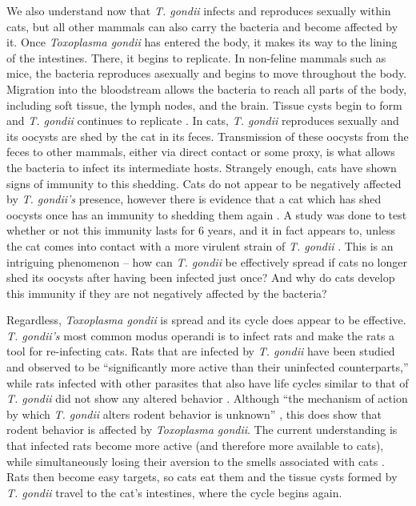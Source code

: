 \documentclass[twocolumn]{article}
\begin{document}
We also understand now that \textit{T. gondii} infects and reproduces sexually within cats, but all other mammals can also carry the bacteria and become affected by it. Once \textit{Toxoplasma gondii} has entered the body, it makes its way to the lining of the intestines. There, it begins to replicate. In non-feline mammals such as mice, the bacteria reproduces asexually and begins to move throughout the body. Migration into the bloodstream allows the bacteria to reach all parts of the body, including soft tissue, the lymph nodes, and the brain. Tissue cysts begin to form and \textit{T. gondii} continues to replicate \cite{Tmice}. In cats, \textit{T. gondii} reproduces sexually and its oocysts are shed by the cat in its feces. Transmission of these oocysts from the feces to other mammals, either via direct contact or some proxy, is what allows the bacteria to infect its intermediate hosts. Strangely enough, cats have shown signs of immunity to this shedding. Cats do not appear to be negatively affected by \textit{T. gondii's} presence, however there is evidence that a cat which has shed oocysts once has an immunity to shedding them again \cite{Tcat_immunity}. A study was done to test whether or not this immunity lasts for 6 years, and it in fact appears to, unless the cat comes into contact with a more virulent strain of \textit{T. gondii} \cite{Tcat_immunity}. This is an intriguing phenomenon – how can \textit{T. gondii} be effectively spread if cats no longer shed its oocysts after having been infected just once? And why do cats develop this immunity if they are not negatively affected by the bacteria?

Regardless, \textit{Toxoplasma gondii} is spread and its cycle does appear to be effective. \textit{T. gondii's} most common modus operandi is to infect rats and make the rats a tool for re-infecting cats. Rats that are infected by \textit{T. gondii} have been studied and observed to be “significantly more active than their uninfected counterparts,” while rats infected with other parasites that also have life cycles similar to that of \textit{T. gondii} did not show any altered behavior \cite{Trat}. Although “the mechanism of action by which \textit{T. gondii} alters rodent behavior is unknown” \cite{Trat}, this does show that rodent behavior is affected by \textit{Toxoplasma gondii}. The current understanding is that infected rats become more active (and therefore more available to cats), while simultaneously losing their aversion to the smells associated with cats \cite{Tpodcast_replace}. Rats then become easy targets, so cats eat them and the tissue cysts formed by \textit{T. gondii} travel to the cat’s intestines, where the cycle begins again.
\end{document}
